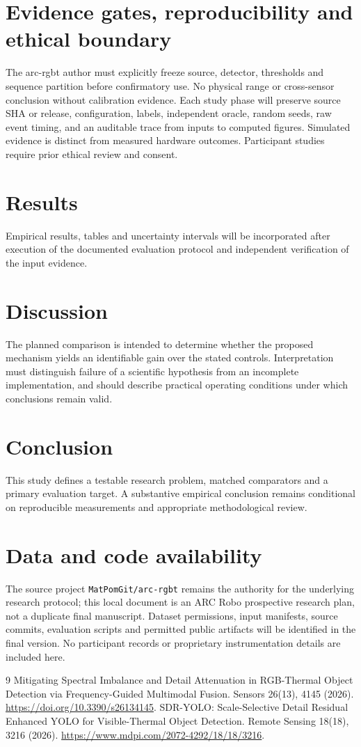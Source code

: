 \documentclass[11pt,a4paper]{article}
\begin{document}
\section{Evidence gates, reproducibility and ethical boundary}
The arc-rgbt author must explicitly freeze source, detector, thresholds and sequence partition before confirmatory use. No physical range or cross-sensor conclusion without calibration evidence. Each study phase will preserve source SHA or release, configuration, labels, independent oracle, random seeds, raw event timing, and an auditable trace from inputs to computed figures. Simulated evidence is distinct from measured hardware outcomes. Participant studies require prior ethical review and consent.

\section{Results}
Empirical results, tables and uncertainty intervals will be incorporated after execution of the documented evaluation protocol and independent verification of the input evidence.

\section{Discussion}
The planned comparison is intended to determine whether the proposed mechanism yields an identifiable gain over the stated controls. Interpretation must distinguish failure of a scientific hypothesis from an incomplete implementation, and should describe practical operating conditions under which conclusions remain valid.

\section{Conclusion}
This study defines a testable research problem, matched comparators and a primary evaluation target. A substantive empirical conclusion remains conditional on reproducible measurements and appropriate methodological review.

\section{Data and code availability}
The source project \texttt{MatPomGit/arc-rgbt} remains the authority for the underlying research protocol; this local document is an ARC Robo prospective research plan, not a duplicate final manuscript. Dataset permissions, input manifests, source commits, evaluation scripts and permitted public artifacts will be identified in the final version. No participant records or proprietary instrumentation details are included here.
\begin{thebibliography}{9}
 Mitigating Spectral Imbalance and Detail Attenuation in RGB-Thermal Object Detection via Frequency-Guided Multimodal Fusion. Sensors 26(13), 4145 (2026). \url{https://doi.org/10.3390/s26134145}.
 SDR-YOLO: Scale-Selective Detail Residual Enhanced YOLO for Visible-Thermal Object Detection. Remote Sensing 18(18), 3216 (2026). \url{https://www.mdpi.com/2072-4292/18/18/3216}.
\end{thebibliography}
\end{document}
